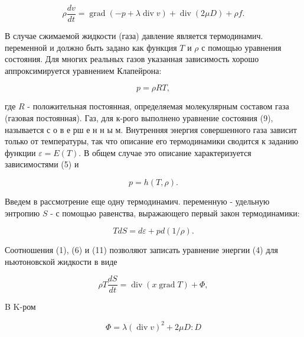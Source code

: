 \documentclass[10pt]{article}
\begin{document}
\[

\rho \frac{d v}{d t}=\operatorname{grad}(-p+\lambda \operatorname{div} v)+\operatorname{div}(2 \mu D)+\rho f .

\]



В случае сжимаемой жидкости (газа) давление является термодинамич. переменной и должно быть задано как функция $T$ и $\rho$ с помощью уравнения состояния. Для многих реальных газов указанная зависимость хорошо аппроксимируется уравнением Клапейрона:



\[

p=\rho R T,

\]



где $R$ - положительная постоянная, определяемая молекулярным составом газа (газовая постоянная). Газ, для к-рого выполнено уравнение состояния (9), называется с о в е рш е н н ы м. Внутренняя энергия совершенного газа зависит только от температуры, так что описание его термодинамики сводится к заданию функции $\varepsilon=E(T)$. В общем случае это описание характеризуется зависимостями (5) и



\[

p=h(T, \rho) .

\]



Введем в рассмотрение еще одну термодинамич. переменную - удельную энтропию $S$ - с помощью равенства, выражающего первый закон термодинамики:



\[

T d S=d \varepsilon+p d(1 / \rho) .

\]



Соотношения (1), (6) и (11) позволяют записать уравнение энергии (4) для ньютоновской жидкости в виде



\[

\rho T \frac{d S}{d t}=\operatorname{div}(x \operatorname{grad} T)+\Phi,

\]



B K-ром



\[

\Phi=\lambda(\operatorname{div} v)^{2}+2 \mu D: D

\]
\end{document}
